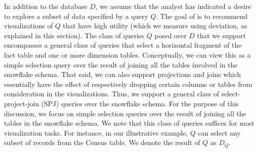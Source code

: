 In addition to the database $D$, we assume that the analyst has indicated
a desire to explore a subset of data specified by a query $Q$.
The goal of \SeeDB is to recommend visualizations of $Q$ that have
high utility (which we measure using deviation, as explained in this section).
The class of queries $Q$ posed over $D$ that we support encompasses a general class of queries 
that select a horizontal fragment of the fact table and one or more dimension tables.
Conceptually, we can view this as a simple selection query over the result of joining all
the tables involved in the snowflake schema. 
That said, we can also support projections and joins which essentially have the effect
of respectively dropping certain columns or tables from consideration in the visualizations.
Thus, we support a general class of select-project-join (SPJ) queries over the snowflake schema.
For the purpose of this discussion, we focus on simple selection
queries over the result of joining all the tables in the snowflake schema.
We note that this class of queries 
suffices for most visualization tasks.
For instance, in our illustrative example, $Q$ can select any subset of records from the
Census table. 
We denote the result of $Q$ as $D_Q$.

